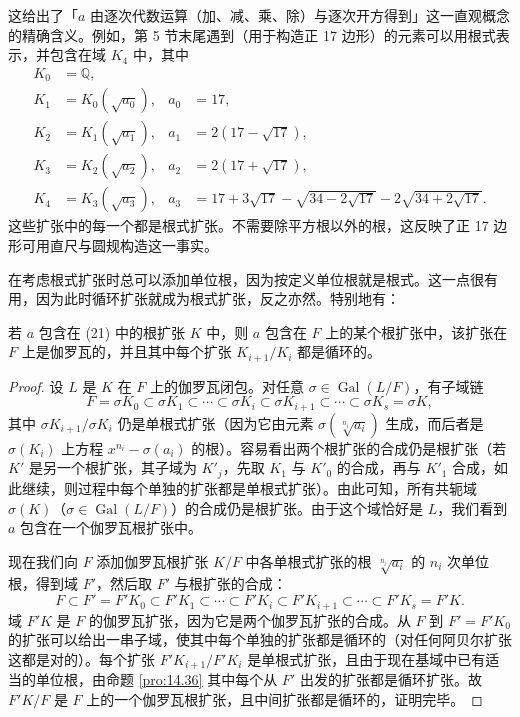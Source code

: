 这给出了「\(a\) 由逐次代数运算（加、减、乘、除）与逐次开方得到」这一直观概念的精确含义。例如，第 5 节末尾遇到（用于构造正 17 边形）的元素可以用根式表示，并包含在域 \(K_4\) 中，其中
\[
\begin{aligned}
K_0 &= \mathbb{Q},\\
K_1 &= K_0(\sqrt{a_0}), & a_0 &= 17,\\
K_2 &= K_1(\sqrt{a_1}), & a_1 &= 2(17-\sqrt{17}),\\
K_3 &= K_2(\sqrt{a_2}), & a_2 &= 2(17+\sqrt{17}),\\
K_4 &= K_3(\sqrt{a_3}), & a_3 &= 17+3\sqrt{17}-\sqrt{34-2\sqrt{17}}-2\sqrt{34+2\sqrt{17}}.
\end{aligned}
\]
这些扩张中的每一个都是根式扩张。不需要除平方根以外的根，这反映了正 17 边形可用直尺与圆规构造这一事实。

在考虑根式扩张时总可以添加单位根，因为按定义单位根就是根式。这一点很有用，因为此时循环扩张就成为根式扩张，反之亦然。特别地有：

\begin{lemma}\label{lem:14.38}
若 \(a\) 包含在 (21) 中的根扩张 \(K\) 中，则 \(a\) 包含在 \(F\) 上的某个根扩张中，该扩张在 \(F\) 上是伽罗瓦的，并且其中每个扩张 \(K_{i+1}/K_i\) 都是循环的。
\end{lemma}

\begin{proof}
设 \(L\) 是 \(K\) 在 \(F\) 上的伽罗瓦闭包。对任意 \(\sigma \in \operatorname{Gal}(L/F)\)，有子域链
\[
F = \sigma K_0 \subset \sigma K_1 \subset \cdots \subset \sigma K_i \subset \sigma K_{i+1} \subset \cdots \subset \sigma K_s = \sigma K,
\]
其中 \(\sigma K_{i+1}/\sigma K_i\) 仍是单根式扩张（因为它由元素 \(\sigma(\sqrt[n_i]{a_i})\) 生成，而后者是 \(\sigma(K_i)\) 上方程 \(x^{n_i}-\sigma(a_i)\) 的根）。容易看出两个根扩张的合成仍是根扩张（若 \(K'\) 是另一个根扩张，其子域为 \(K'_j\)，先取 \(K_1\) 与 \(K'_0\) 的合成，再与 \(K'_1\) 合成，如此继续，则过程中每个单独的扩张都是单根式扩张）。由此可知，所有共轭域 \(\sigma(K)\)（\(\sigma \in \operatorname{Gal}(L/F)\)）的合成仍是根扩张。由于这个域恰好是 \(L\)，我们看到 \(a\) 包含在一个伽罗瓦根扩张中。

现在我们向 \(F\) 添加伽罗瓦根扩张 \(K/F\) 中各单根式扩张的根 \(\sqrt[n_i]{a_i}\) 的 \(n_i\) 次单位根，得到域 \(F'\)，然后取 \(F'\) 与根扩张的合成：
\[
F \subset F' = F'K_0 \subset F'K_1 \subset \cdots \subset F'K_i \subset F'K_{i+1} \subset \cdots \subset F'K_s = F'K.
\]
域 \(F'K\) 是 \(F\) 的伽罗瓦扩张，因为它是两个伽罗瓦扩张的合成。从 \(F\) 到 \(F' = F'K_0\) 的扩张可以给出一串子域，使其中每个单独的扩张都是循环的（对任何阿贝尔扩张这都是对的）。每个扩张 \(F'K_{i+1}/F'K_i\) 是单根式扩张，且由于现在基域中已有适当的单位根，由命题 \ref{pro:14.36} 其中每个从 \(F'\) 出发的扩张都是循环扩张。故 \(F'K/F\) 是 \(F\) 上的一个伽罗瓦根扩张，且中间扩张都是循环的，证明完毕。
\end{proof}

